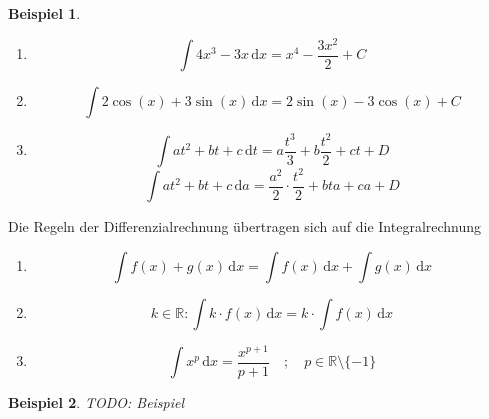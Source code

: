 \documentclass{report}
\newtheorem{myexample}{Beispiel}
\begin{document}
\begin{myexample}
\begin{enumerate}Wir berechnen die unbestimmten Integrale:
\item \begin{equation}\int \! 4x^3 - 3x \, \mathrm{d} x = x^4 - \frac{3x^2}{2} + C\end{equation}
\item \begin{equation}\int \! 2 \cos(x) + 3 \sin(x) \, \mathrm{d} x = 2 \sin(x) - 3\cos(x) + C\end{equation}
\item \begin{equation}\int \! at^2 + bt + c \, \mathrm{d} t = a \frac{t^3}{3} + b \frac{t^2}{2} + ct + D\end{equation}
\begin{equation}\int \! at^2 + bt + c \, \mathrm{d} a = \frac{a^2}{2} \cdot \frac{t^2}{2} + bta + ca + D\end{equation}
\end{enumerate}\end{myexample}
Die Regeln der Differenzialrechnung übertragen sich auf die Integralrechnung
\begin{enumerate}
\item \begin{equation}\int \! f(x) + g(x) \, \mathrm{d} x = \int \! f(x) \, \mathrm{d} x + \int \! g(x) \, \mathrm{d} x\end{equation}
\item \begin{equation}k \in \mathbb{R}: \int \! k \cdot f(x) \, \mathrm{d} x = k \cdot \int \! f(x) \, \mathrm{d} x\end{equation}
\item \begin{equation}\int \! x^p \, \mathrm{d} x = \frac{x^{p+1}}{p+1} \quad ; \quad p \in \mathbb{R} \setminus \{-1\}\end{equation}
\end{enumerate}
\begin{myexample}TODO: Beispiel\end{myexample}
\end{document}
